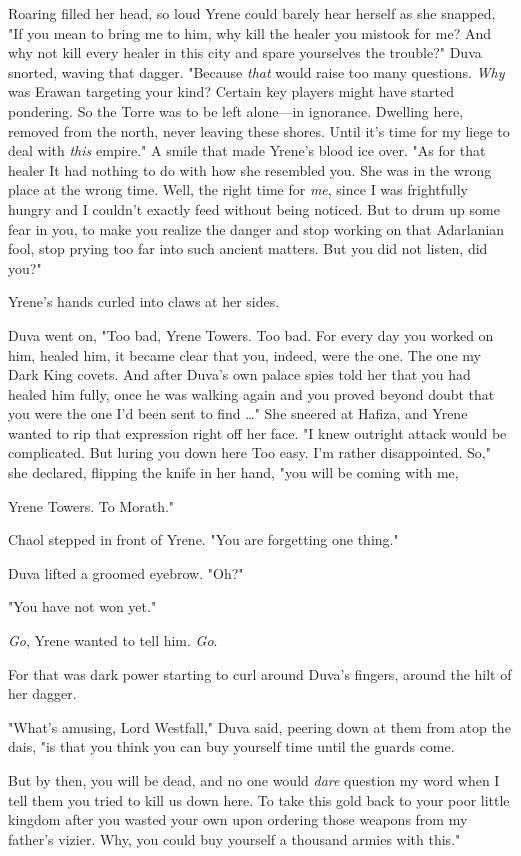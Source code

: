 Roaring filled her head, so loud Yrene could barely hear herself as she snapped, "If you mean to bring me to him, why kill the healer you mistook for me? And why not kill every healer in this city and spare yourselves the trouble?" Duva snorted, waving that dagger. "Because
\emph{that} would raise too many questions. \emph{Why} was Erawan targeting your kind? Certain key players might have started pondering. So the Torre was to be left alone---in ignorance. Dwelling here, removed from the north, never leaving these shores. Until it's time for my liege to deal with \emph{this} empire." A smile that made Yrene's blood ice over. "As for that healer  It had nothing to do with how she resembled you. She was in the wrong place at the wrong time. Well, the right time for \emph{me}, since I was frightfully hungry and I couldn't exactly feed without being noticed. But to drum up some fear in you, to make you realize the danger and stop working on that Adarlanian fool, stop prying too far into such ancient matters. But you did not listen, did you?"

Yrene's hands curled into claws at her sides.

Duva went on, "Too bad, Yrene Towers. Too bad. For every day you worked on him, healed him, it became clear that you, indeed, were the one. The one my Dark King covets. And after Duva's own palace spies told her that you had healed him fully, once he was walking again and you proved beyond doubt that you were the one I'd been sent to find \ldots" She sneered at Hafiza, and Yrene wanted to rip that expression right off her face. "I knew outright attack would be complicated. But luring you down here  Too easy. I'm rather disappointed. So," she declared, flipping the knife in her hand, "you will be coming with me,

Yrene Towers. To Morath."

Chaol stepped in front of Yrene. "You are forgetting one thing."

Duva lifted a groomed eyebrow. "Oh?"

"You have not won yet."

\emph{Go}, Yrene wanted to tell him. \emph{Go}.

For that was dark power starting to curl around Duva's fingers, around the hilt of her dagger.

"What's amusing, Lord Westfall," Duva said, peering down at them from atop the dais, "is that you think you can buy yourself time until the guards come.

But by then, you will be dead, and no one would \emph{dare} question my word when I tell them you tried to kill us down here. To take this gold back to your poor little kingdom after you wasted your own upon ordering those weapons from my father's vizier. Why, you could buy yourself a thousand armies with this."


